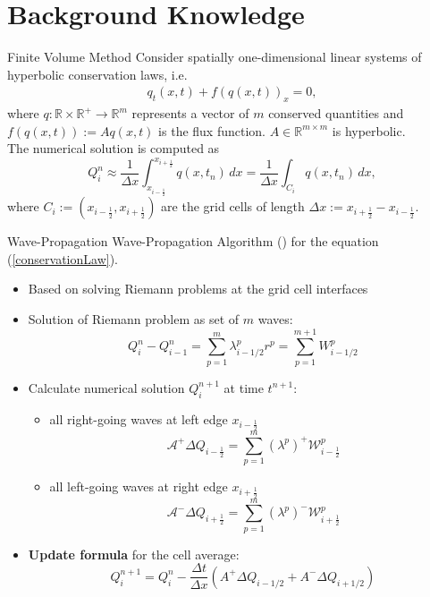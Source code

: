 \section{Background Knowledge}
\begin{frame}{Finite Volume Method}
	\scriptsize
	Consider spatially one-dimensional linear systems of hyperbolic
	conservation laws, i.e.
	\begin{align}
		q_t(x,t) + f(q(x,t))_x = 0, \label{conservationLaw}
	\end{align}
	where $q: \mathbb{R} \times \mathbb{R}^+ \rightarrow \mathbb{R}^m$ represents a vector of $m$ conserved quantities and $f(q(x,t)) := Aq(x,t)$ is the flux function. $A \in \mathbb{R}^{m \times m}$ is hyperbolic. \\
	\vspace{\baselineskip}
	The numerical solution is computed as
    \[
    Q^n_i \approx \frac{1}{\Delta x} \int_{x_{i-\frac{1}{2}}}^{x_{i+\frac{1}{2}}} q(x,t_n) \, dx = \frac{1}{\Delta x} \int_{C_i} q(x,t_n) \, dx,
    \]
	where $C_i := (x_{i-\frac{1}{2}}, x_{i+\frac{1}{2}})$ are the grid cells of length $\Delta x := x_{i+\frac{1}{2}} - x_{i-\frac{1}{2}}$.
\end{frame}



\begin{frame}{Wave-Propagation}
\scriptsize
Wave-Propagation Algorithm (\cite{zbMATH00994008}) for the equation (\ref{conservationLaw}).

\begin{itemize}
	\item Based on solving Riemann problems at the grid cell interfaces
	\item Solution of Riemann problem as set of $m$ waves:
    \[Q^n_i - Q^n_{i-1} = \sum_{p=1}^{m} \lambda^p_{i-1/2} r^p = \sum_{p=1}^{m+1} W^p_{i-1/2}\]
    \pause
	\item Calculate numerical solution $Q^{n+1}_i$ at time $t^{n+1}$:
	\begin{itemize}
		\item all right-going waves at left edge $x_{i-\frac{1}{2}}$
		\[\mathcal{A}^{+} \Delta Q_{i-\frac{1}{2}}=\sum_{p=1}^m\left(\lambda^p\right)^{+} \mathcal{W}_{i-\frac{1}{2}}^{p}\]
		\item all left-going waves at right edge $x_{i+\frac{1}{2}}$
		\[\mathcal{A}^{-} \Delta Q_{i+\frac{1}{2}}=\sum_{p=1}^m\left(\lambda^p\right)^{-} \mathcal{W}_{i+\frac{1}{2}}^{p}	\]
	\end{itemize}
   \pause
   \item \textbf{Update formula} for the cell average:
   \[Q^{n+1}_i = Q^n_i - \frac{\Delta t}{\Delta x} \left( A^+ \Delta Q_{i-1/2} + A^- \Delta Q_{i+1/2} \right)\]
\end{itemize}
\end{frame}

